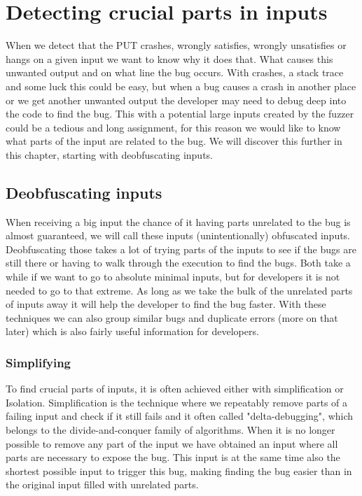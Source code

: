 \chapter{Detecting crucial parts in inputs}
\label{cha:3:intro}
When we detect that the PUT crashes, wrongly satisfies, wrongly unsatisfies or hangs on a given input we want to know why it does that. What causes this unwanted output and on what line the bug occurs. With crashes, a stack trace and some luck this could be easy, but when a bug causes a crash in another place or we get another unwanted output the developer may need to debug deep into the code to find the bug. This with a potential large inputs created by the fuzzer could be a tedious and long assignment, for this reason we would like to know what parts of the input are related to the bug. We will discover this further in this chapter, starting with deobfuscating inputs.


\section{Deobfuscating inputs}
\label{cha:3:Deobfuscating}
When receiving a big input the chance of it having parts unrelated to the bug is almost guaranteed, we will call these inputs (unintentionally) obfuscated inputs. Deobfuscating those takes a lot of trying parts of the inputs to see if the bugs are still there\cite{bookZellerwhyProgramsFail} or having to walk through the execution to find the bugs. Both take a while if we want to go to absolute minimal inputs, but for developers it is not needed to go to that extreme. As long as we take the bulk of the unrelated parts of inputs away it will help the developer to find the bug faster. With these techniques we can also group similar bugs and duplicate errors (more on that later) which is also fairly useful information for developers.
\subsection{Simplifying}
\label{cha:3:Simplifying}
To find crucial parts of inputs, it is often achieved either with simplification or Isolation. 
Simplification is the technique where we repeatably remove parts of a failing input and check if it still fails and it often called "delta-debugging"\cite{bookZellerwhyProgramsFail}, which belongs to the divide-and-conquer family of algorithms\cite{2FuzzingAndDeltaDebuggingSMTSolvers}. 
When it is no longer possible to remove any part of the input we have obtained an input where all parts are necessary to expose the bug. This input is at the same time also the shortest possible input to trigger this bug, making finding the bug easier than in the original input filled with unrelated parts.
